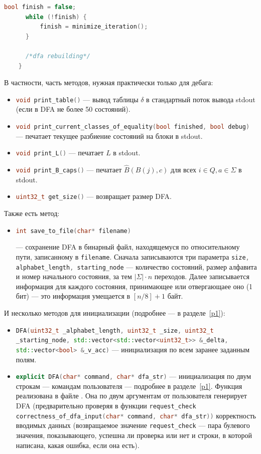 \documentclass{article}
\begin{document}
\begin{itemize}
\begin{lstlisting}[language=C++]
      bool finish = false;
      while (!finish) {
          finish = minimize_iteration();
      }

      /*dfa rebuilding*/
    }
  \end{lstlisting}
\end{itemize}
В частности, часть методов, нужная практически только для дебага:
\begin{itemize}
\item[\ding{228}] \lstinline[language=C++]!void print_table()! --- вывод таблицы $\delta$ в стандартный поток вывода stdout (если в DFA не более 50 состояний).
\item[\ding{228}] \lstinline[language=C++]!void print_current_classes_of_equality(bool finished, bool debug)! --- печатает текущее разбиение состояний на блоки в stdout.
\item[\ding{228}] \lstinline[language=C++]!void print_L()! --- печатает $L$ в stdout.
\item[\ding{228}] \lstinline[language=C++]!void print_B_caps()! --- печатает $\hat B(B(j), c)$ для всех $i \in Q, a \in \Sigma$ в stdout.
\item[\ding{228}] \lstinline[language=C++]!uint32_t get_size()! --- возвращает размер DFA.
\end{itemize}
Также есть метод:
\begin{itemize}
  \item[\ding{228}] \hypertarget{p2}{\lstinline[language=C++]!int save_to_file(char* filename)!} --- сохранение DFA в бинарный файл, находящемуся по относительному пути, записанному в \lstinline[language=C++]!filename!. Сначала записываются три параметра \lstinline[language=C++]!size, alphabet_length, starting_node! --- количество состояний, размер алфавита и номер начального состояния, за тем $|\Sigma| \cdot n$ переходов. Далее записывается информация для каждого состояния, принимающее или отвергающаее оно (1 бит) --- это информация умещается в $[n/8] + 1$ байт. 
\end{itemize}
И несколько методов для инициализации (подробнее --- в разделе~\ref{p1}):
\begin{itemize}
  \item[\ding{228}] \lstinline[language=C++]!DFA(uint32_t _alphabet_length, uint32_t _size, uint32_t _starting_node, std::vector<std::vector<uint32_t>> &_delta, std::vector<bool> &_v_acc)! --- инициализация по всем заранее заданным полям.
  \item[\ding{228}] \lstinline[language=C++]!explicit DFA(char* command, char* dfa_str)! --- инициализация по двум строкам --- командам пользователя --- подробнее в разделе~\ref{p1}. Функция реализована в файле . Она по двум аргументам от пользователя генерирует DFA (предварительно проверяя в функции \lstinline[language=C++]!request_check correctness_of_dfa_input(char* command, char* dfa_str))! корректность вводимых данных (возвращаемое значение \lstinline[language=C++]!request_check! --- пара булевого значения, показывающего, успешна ли проверка или нет и строки, в которой написана, какая ошибка, если она есть).
  \end{itemize}
\end{document}

